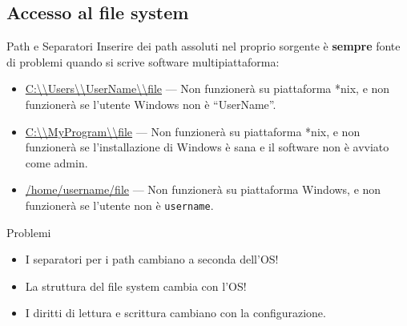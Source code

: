 \documentclass[presentation]{beamer}
\begin{document}
\subsection{Accesso al file system}
\begin{frame}{Path e Separatori}
Inserire dei path assoluti nel proprio sorgente è \textbf{sempre} fonte di problemi quando si scrive software multipiattaforma:
\begin{itemize}
\item \url{C:\\Users\\UserName\\file} --- Non funzionerà su piattaforma *nix, e non funzionerà se l'utente Windows non è ``UserName''.

\item \url{C:\\MyProgram\\file} --- Non funzionerà su piattaforma *nix, e non funzionerà se l'installazione di Windows è sana e il software non è avviato come admin.

\item \url{/home/username/file} --- Non funzionerà su piattaforma Windows, e non funzionerà se l'utente non è \texttt{username}.
\end{itemize}

\begin{block}{Problemi}
\begin{itemize}
\item I separatori per i path cambiano a seconda dell'OS!
\item La struttura del file system cambia con l'OS!
\item I diritti di lettura e scrittura cambiano con la configurazione.
\end{itemize}
\end{block}
\end{frame}
\end{document}
